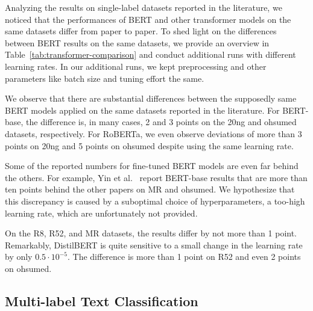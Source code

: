 \documentclass[lettersize,journal]{IEEEtran}
\newcommand{\myheader}{}
\begin{document}
Analyzing the results on single-label datasets reported in the literature, we noticed that the performances of BERT and other transformer models on the same datasets differ from paper to paper.
To shed light on the differences between BERT results on the same datasets, we provide an overview in Table~\ref{tab:transformer-comparison} and conduct additional runs with different learning rates.
In our additional runs, we kept preprocessing and other parameters like batch size and tuning effort the same.

We observe that there are substantial differences between the supposedly same BERT models applied on the same datasets reported in the literature.
For BERT-base, the difference is, in many cases, 2 and 3 points on the 20ng and ohsumed datasets, respectively.
For RoBERTa, we even observe deviations of more than 3 points on 20ng and 5 points on ohsumed despite using the same learning rate.

Some of the reported numbers for fine-tuned BERT models are even far behind the others.
For example, Yin et al.~\cite{gltc2023} report BERT-base results that are more than ten points behind the other papers on MR and ohsumed.
We hypothesize that this discrepancy is caused by a suboptimal choice of hyperparameters, \eg a too-high learning rate, which are unfortunately not provided.

On the R8, R52, and MR datasets, the results differ by not more than 1 point.
Remarkably, DistilBERT is quite sensitive to a small change in the learning rate by only $0.5 \cdot 10^{-5}$.
The difference is more than 1 point on R52 and even 2 points on ohsumed.

\renewcommand{\myheader}{
  \caption{Comparison of different transformer models and hyperparameter settings. We report mean accuracy and standard deviation over five runs on the single-label text classification datasets (inductive). Column ``Provenance'' reports the source.
    N/P refers to the case where the paper (or potential supplementary materials) did not provide information about the learning rate.
    }
    
    \label{tab:transformer-comparison}
}


\subsection{Multi-label Text Classification}

\renewcommand{\myheader}{
\caption{Results for the inductive multi-label text classification datasets. 
    We report the sample-based F1 metric to reflect how well the classifier performs on average per a set of new documents.
    Standard deviation across runs is denoted in braces.}\label{tab:results_multi-label_classification}
}

\end{document}
